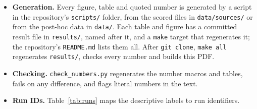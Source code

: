 \documentclass[11pt,letterpaper]{article}
\begin{document}
\begin{itemize}[itemsep=1pt]
  \item \textbf{Generation.} Every figure, table and quoted number is generated by a script in the repository's
  \nolinkurl{scripts/} folder, from the scored files in \nolinkurl{data/sources/} or from the post-hoc data in
  \nolinkurl{data/}. Each table and figure has a committed result file in \nolinkurl{results/}, named after it, and
  a \texttt{make} target that regenerates it; the repository's \nolinkurl{README.md} lists them all. After
  \texttt{git clone}, \texttt{make all} regenerates \nolinkurl{results/}, checks every number and builds this PDF.
  \item \textbf{Checking.} \texttt{check\_numbers.py} regenerates the number macros and tables, fails on any
  difference, and flags literal numbers in the text.
  \item \textbf{Run IDs.} Table~\ref{tab:runs} maps the descriptive labels to run identifiers.
\end{itemize}

\end{document}
